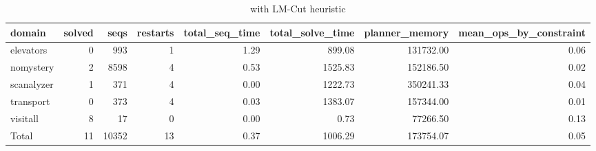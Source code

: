 \begin{table*}[htbp]
\centering
\begingroup\small
\begin{tabular}{lrrrrrrr}
  \hline
domain & solved & seqs & restarts & total\_seq\_time & total\_solve\_time & planner\_memory & mean\_ops\_by\_constraint \\ 
  \hline
elevators &   0 & 993 &   1 & 1.29 & 899.08 & 131732.00 & 0.06 \\ 
  nomystery &   2 & 8598 &   4 & 0.53 & 1525.83 & 152186.50 & 0.02 \\ 
  scanalyzer &   1 & 371 &   4 & 0.00 & 1222.73 & 350241.33 & 0.04 \\ 
  transport &   0 & 373 &   4 & 0.03 & 1383.07 & 157344.00 & 0.01 \\ 
  visitall &   8 &  17 &   0 & 0.00 & 0.73 & 77266.50 & 0.13 \\ 
  Total &  11 & 10352 &  13 & 0.37 & 1006.29 & 173754.07 & 0.05 \\ 
   \hline
\end{tabular}
\endgroup
\caption{\oursolver{} with LM-Cut heuristic} 
\label{tab:selected_lmcut}
\end{table*}
